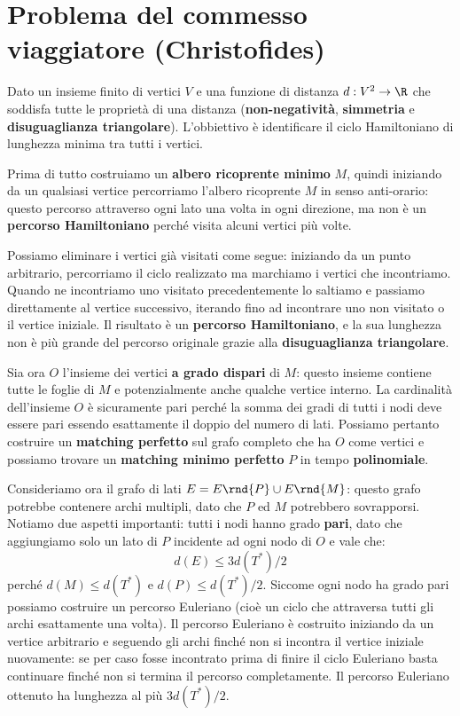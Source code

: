 \documentclass[\main/main.tex]{subfiles}
\begin{document}
\section{Problema del commesso viaggiatore (Christofides)}
\begin{multicols}{2}
\begin{problem}
    Dato un insieme finito di vertici \(V\) e una funzione di distanza \(d: V^2 \rightarrow \R\) che soddisfa tutte le proprietà di una distanza (\textbf{non-negatività}, \textbf{simmetria} e \textbf{disuguaglianza triangolare}). L'obbiettivo è identificare il ciclo Hamiltoniano di lunghezza minima tra tutti i vertici.
\end{problem}
\begin{definition}
    Prima di tutto costruiamo un \textbf{albero ricoprente minimo} \(M\), quindi iniziando da un qualsiasi vertice percorriamo l'albero ricoprente \(M\) in senso anti-orario: questo percorso attraverso ogni lato una volta in ogni direzione, ma non è un \textbf{percorso Hamiltoniano} perché visita alcuni vertici più volte. 
    
    Possiamo eliminare i vertici già visitati come segue: iniziando da un punto arbitrario, percorriamo il ciclo realizzato ma marchiamo i vertici che incontriamo. Quando ne incontriamo uno visitato precedentemente lo saltiamo e passiamo direttamente al vertice successivo, iterando fino ad incontrare uno non visitato o il vertice iniziale. Il risultato è un \textbf{percorso Hamiltoniano}, e la sua lunghezza non è più grande del percorso originale grazie alla \textbf{disuguaglianza triangolare}.
    
    Sia ora \(O\) l'insieme dei vertici \textbf{ a grado dispari} di \(M\): questo insieme contiene tutte le foglie di \(M\) e potenzialmente anche qualche vertice interno. La cardinalità dell'insieme \(O\) è sicuramente pari perché la somma dei gradi di tutti i nodi deve essere pari essendo esattamente il doppio del numero di lati. Possiamo pertanto costruire un \textbf{matching perfetto} sul grafo completo che ha \(O\) come vertici e possiamo trovare un \textbf{matching minimo perfetto} \(P\) in tempo \textbf{polinomiale}.
    
    Consideriamo ora il grafo di lati \(E = E\rnd{P} \cup E\rnd{M}\): questo grafo potrebbe contenere archi multipli, dato che \(P\) ed \(M\) potrebbero sovrapporsi. Notiamo due aspetti importanti: tutti i nodi hanno grado \textbf{pari}, dato che aggiungiamo solo un lato di \(P\) incidente ad ogni nodo di \(O\) e vale che:
    \[
        d(E) \leq 3 d\left(T^{*}\right) / 2
    \]
    perché \(d(M) \leq d\left(T^{*}\right)\) e \(d(P) \leq d\left(T^{*}\right) / 2\). Siccome ogni nodo ha grado pari possiamo costruire un percorso Euleriano (cioè un ciclo che attraversa tutti gli archi esattamente una volta). Il percorso Euleriano è costruito iniziando da un vertice arbitrario e seguendo gli archi finché non si incontra il vertice iniziale nuovamente: se per caso fosse incontrato prima di finire il ciclo Euleriano basta continuare finché non si termina il percorso completamente. Il percorso Euleriano ottenuto ha lunghezza al più \( 3 d\left(T^{*}\right) / 2\). 
    

\end{definition}
\end{multicols}
\end{document}
